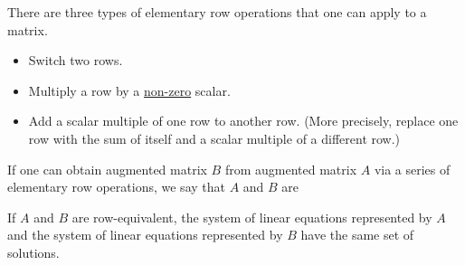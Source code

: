 
\edXsolution{  }

\endedxproblem




\endedxvertical




There are three types of elementary row operations that one can apply to a matrix.  

\begin{itemize}
\item Switch two rows.  
\item Multiply a row by a {\underline{non-zero}} scalar.  
\item Add a scalar multiple of one row to another row.   (More precisely, replace one row with the sum of itself and a scalar multiple of a different row.)  
\end{itemize}

If one can obtain augmented matrix $B$ from augmented matrix $A$ via a series of elementary row operations, 
we say that $A$ and $B$ are {} 

If $A$ and $B$ are row-equivalent, the system of linear equations represented by $A$ and the system of linear equations represented by $B$ have the same set of solutions.  

\endedxtext



\endedxvertical

